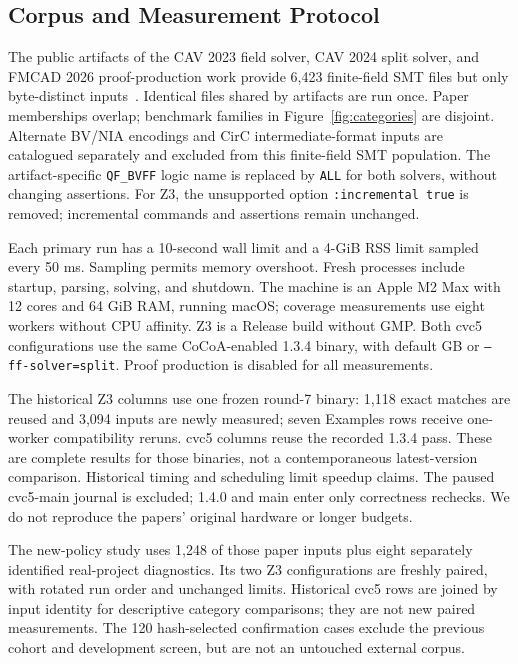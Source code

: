 \documentclass[runningheads]{llncs}
\newcommand{\flag}[1]{\texttt{#1}}
\begin{document}
\subsection{Corpus and Measurement Protocol}

The public artifacts of the CAV 2023 field solver, CAV 2024 split solver, and
FMCAD 2026 proof-production work provide 6,423 finite-field SMT files but only
\CorpusN{} byte-distinct inputs~\cite{artifact23,artifact24,artifact26}.
Identical files shared by artifacts are run once. Paper memberships overlap;
benchmark families in Figure~\ref{fig:categories} are disjoint. Alternate BV/NIA
encodings and CirC intermediate-format inputs are catalogued separately and
excluded from this finite-field SMT population. The artifact-specific
\flag{QF\_BVFF} logic name is replaced by \flag{ALL} for both solvers, without
changing assertions. For Z3, the unsupported option \flag{:incremental true}
 is removed; incremental commands and assertions remain unchanged.

Each primary run has a 10-second wall limit and a 4-GiB RSS limit sampled every
50 ms. Sampling permits memory overshoot. Fresh processes include startup,
parsing, solving, and shutdown. The machine is an Apple M2 Max with 12 cores
and 64 GiB RAM, running macOS; coverage measurements use eight workers without
CPU affinity. Z3 is a Release build without GMP. Both cvc5 configurations use
the same CoCoA-enabled 1.3.4 binary, with default GB or \flag{--ff-solver=split}.
Proof production is disabled for all measurements.

The historical Z3 columns use one frozen round-7 binary: 1,118 exact matches
are reused and 3,094 inputs are newly measured; seven Examples rows receive
one-worker compatibility reruns. cvc5 columns reuse the recorded 1.3.4 pass.
These are complete results for those binaries, not a contemporaneous latest-version
comparison. Historical timing and scheduling limit speedup claims. The paused
cvc5-main journal is excluded; 1.4.0 and main enter only correctness rechecks.
We do not reproduce the papers' original hardware or longer budgets.

The new-policy study uses 1,248 of those paper inputs plus eight separately
identified real-project diagnostics. Its two Z3 configurations are freshly
paired, with rotated run order and unchanged limits. Historical cvc5 rows are
joined by input identity for descriptive category comparisons; they are not
new paired measurements. The 120 hash-selected confirmation cases exclude the
previous cohort and development screen, but are not an untouched external corpus.
\end{document}
